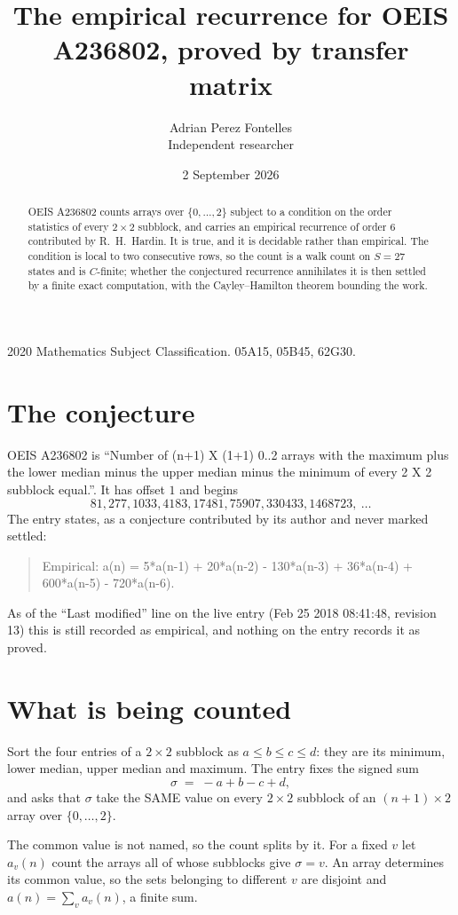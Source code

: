 \documentclass[11pt,a4paper]{article}
\title{The empirical recurrence for OEIS A236802, proved by transfer matrix}
\author{Adrian Perez Fontelles\\ \small Independent researcher}
\date{2 September 2026}
\theoremstyle{plain}
\theoremstyle{definition}
\begin{document}
\maketitle

\begin{abstract}
OEIS A236802 counts arrays over $\{0,\dots,2\}$ subject to a condition on the order
statistics of every $2\times2$ subblock, and carries an empirical recurrence of order
$6$ contributed by R.~H.~Hardin. It is true, and it is decidable rather than empirical.
The condition is local to two consecutive rows, so the count is a walk count on $S=27$
states and is $C$-finite; whether the conjectured recurrence annihilates it is then settled by
a finite exact computation, with the Cayley--Hamilton theorem bounding the work.
\end{abstract}

\noindent\small 2020 Mathematics Subject Classification. 05A15, 05B45, 62G30.\normalsize

\section{The conjecture}

OEIS A236802 is ``Number of (n+1) X (1+1) 0..2 arrays with the maximum plus the lower median minus the upper median minus the minimum of every 2 X 2 subblock equal.''. It has offset $1$ and begins
\[
81, 277, 1033, 4183, 17481, 75907, 330433, 1468723,\ \dots
\]
The entry states, as a conjecture contributed by its author and never marked settled:
\begin{quote}
Empirical: a(n) = 5*a(n-1) + 20*a(n-2) - 130*a(n-3) + 36*a(n-4) + 600*a(n-5) - 720*a(n-6).
\end{quote}
As of the ``Last modified'' line on the live entry (Feb 25 2018 08:41:48, revision 13) this is still
recorded as empirical, and nothing on the entry records it as proved.

\section{What is being counted}

Sort the four entries of a $2\times2$ subblock as $a\le b\le c\le d$: they
are its minimum, lower median, upper median and maximum. The entry fixes the signed sum
\[
\sigma\;=\;-a+b-c+d,
\]
and asks that $\sigma$ take the SAME value on every $2\times2$ subblock of an
$(n+1)\times2$ array over $\{0,\dots,2\}$.

The common value is not named, so the count splits by it. For a fixed $v$ let $a_v(n)$ count
the arrays all of whose subblocks give $\sigma=v$. An array determines its common value, so
the sets belonging to different $v$ are disjoint and $a(n)=\sum_v a_v(n)$, a finite sum.
\end{document}
